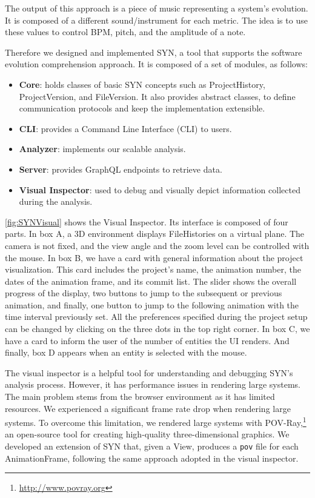 \documentclass[11pt,twoside,english,singlespacing,headsepline,consistentlayout]{auxiliary/si-msc-thesis}
\begin{document}
The output of this approach is a piece of music representing a system's evolution. It is composed of a different sound/instrument for each metric. The idea is to use these values to control BPM, pitch, and the amplitude of a note. 

Therefore we designed and implemented SYN, a tool that supports the software evolution comprehension approach. 
It is composed of a set of modules, as follows:
\begin{itemize}
    \item \textbf{Core}: holds classes of basic SYN concepts such as ProjectHistory, ProjectVersion, and FileVersion. It also provides abstract classes, to define communication protocols and keep the implementation extensible.
    \item \textbf{CLI}: provides a Command Line Interface (CLI) to users.
    \item \textbf{Analyzer}: implements our scalable analysis. 
    \item \textbf{Server}: provides GraphQL endpoints to retrieve data. 
    \item \textbf{Visual Inspector}: used to debug and visually depict information collected during the analysis.
\end{itemize}  

\autoref{fig:SYNVisual} shows the Visual Inspector. Its interface is composed of four parts.
In box A, a 3D environment displays FileHistories on a virtual plane. The camera is not fixed, and the view angle and the zoom level can be controlled with the mouse. 
In box B, we have a card with general information about the project visualization. 
This card includes the project's name, the animation number, the dates of the animation frame, and its commit list. The slider shows the overall progress of the display, two buttons to jump to the subsequent or previous animation, and finally, one button to jump to the following animation with the time interval previously set. 
All the preferences specified during the project setup can be changed by clicking on the three dots in the top right corner.
In box C, we have a card to inform the user of the number of entities the UI renders. 
And finally, box D appears when an entity is selected with the mouse. 

The visual inspector is a helpful tool for understanding and debugging SYN's analysis process. However, it has performance issues in rendering large systems. The main problem stems from the browser environment as it has limited resources. We experienced a significant frame rate drop when rendering large systems. To overcome this limitation, we rendered large systems with POV-Ray,\footnote{\url{http://www.povray.org}} an open-source tool for creating high-quality three-dimensional graphics. We developed an extension of SYN that, given a View, produces a \texttt{pov} file for each AnimationFrame, following the same approach adopted in the visual inspector.  
\end{document}
